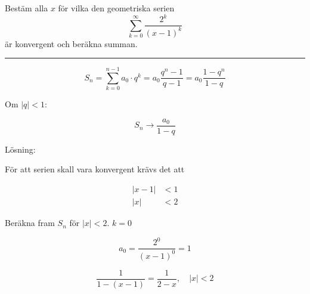 \documentclass[11pt]{article}
\begin{document}
Bestäm alla $x$ för vilka den geometriska serien
\[
  \sum_{k = 0}^{\infty} \frac{2^k}{(x - 1)^k}
\]
är konvergent och beräkna summan.

\rule{\textwidth}{0.5pt}

\[
    S_n = \sum_{k = 0}^{n - 1} a_0 \cdot q^k = a_0 \frac{q^n - 1}{q - 1} = a_0 \frac{1 - q^n}{1 - q}
\]

Om $|q| < 1$:

\[
    S_n \rightarrow \frac{a_0}{1 - q}
\]

Lösning:

För att serien skall vara konvergent krävs det att

\begin{align*}
    |x - 1| &< 1\\
    |x| &< 2
\end{align*}

Beräkna fram $S_n$ för $|x| < 2$. $k = 0$

\[
    a_0 = \frac{2^0}{(x - 1)^0} = 1
\]

\[
    \frac{1}{1 - (x - 1)} = \frac{1}{2 - x}, \quad |x| < 2
\]

\end{document}
